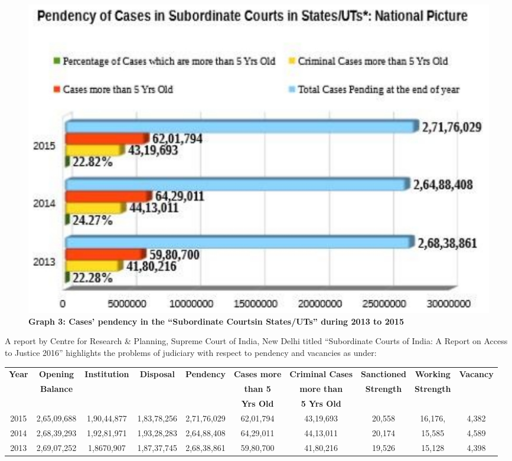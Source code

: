 \begin{figure}
\centering
\includegraphics[scale=1]{src/images/chap5/003.eps}
\caption*{\textbf{Graph 3: Cases’ pendency in the “Subordinate Courtsin States/UTs” during 2013 to 2015}}\label{fig03}
\end{figure}

\vspace{-.5cm}

\begin{multicols}{2}
\vspace{-.3cm}
\noi
A report by Centre for Research \& Planning, Supreme Court of India, New Delhi titled
“Subordinate Courts of India: A Report on Access to Justice 2016” highlights the problems of
judiciary with respect to pendency and vacancies as under:
\end{multicols}

\vspace{-.2cm}

\noi
{\fontsize{8}{10}\selectfont
\begin{tabular}{|c|c|c|c|c|c|c|c|c|c|}
\hline
{\bf Year} & {\bf Opening}  &{\bf Institution} & {\bf Disposal} & {\bf Pendency} & {\bf Cases more}   & {\bf Criminal Cases}  & {\bf Sanctioned}  &{\bf  Working}& {\bf Vacancy}\\
     & {\bf Balance}  &            &           &          & {\bf than 5}   & {\bf more than}     &{\bf Strength} & {\bf Strength} & \\
     &           &          &           &           & {\bf Yrs Old} &  {\bf 5 Yrs Old}                  &                 &          & \\ \hline
2015 & 2,65,09,688 & 1,90,44,877&1,83,78,256&2,71,76,029&62,01,794&43,19,693&20,558&16,176,&4,382\\\hline 
2014 & 2,68,39,293&1,92,81,971&1,93,28,283&2,64,88,408&64,29,011&44,13,011&20,174&15,585&4,589\\\hline
2013&2,69,07,252&1,8670,907&1,87,37,745&2,68,38,861&59,80,700&41,80,216&19,526&15,128&4,398\\\hline           
\end{tabular}}


